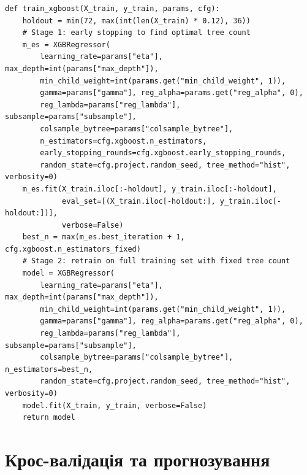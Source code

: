 \documentclass{bachelor_thesis}
\begin{document}
\begin{lstlisting}[caption={Підбір гіперпараметрів та фінальне навчання XGBoost}]
def train_xgboost(X_train, y_train, params, cfg):
    holdout = min(72, max(int(len(X_train) * 0.12), 36))
    # Stage 1: early stopping to find optimal tree count
    m_es = XGBRegressor(
        learning_rate=params["eta"], max_depth=int(params["max_depth"]),
        min_child_weight=int(params.get("min_child_weight", 1)),
        gamma=params["gamma"], reg_alpha=params.get("reg_alpha", 0),
        reg_lambda=params["reg_lambda"], subsample=params["subsample"],
        colsample_bytree=params["colsample_bytree"],
        n_estimators=cfg.xgboost.n_estimators,
        early_stopping_rounds=cfg.xgboost.early_stopping_rounds,
        random_state=cfg.project.random_seed, tree_method="hist", verbosity=0)
    m_es.fit(X_train.iloc[:-holdout], y_train.iloc[:-holdout],
             eval_set=[(X_train.iloc[-holdout:], y_train.iloc[-holdout:])],
             verbose=False)
    best_n = max(m_es.best_iteration + 1, cfg.xgboost.n_estimators_fixed)
    # Stage 2: retrain on full training set with fixed tree count
    model = XGBRegressor(
        learning_rate=params["eta"], max_depth=int(params["max_depth"]),
        min_child_weight=int(params.get("min_child_weight", 1)),
        gamma=params["gamma"], reg_alpha=params.get("reg_alpha", 0),
        reg_lambda=params["reg_lambda"], subsample=params["subsample"],
        colsample_bytree=params["colsample_bytree"], n_estimators=best_n,
        random_state=cfg.project.random_seed, tree_method="hist", verbosity=0)
    model.fit(X_train, y_train, verbose=False)
    return model
\end{lstlisting}

\section{Крос-валідація та прогнозування}
\label{sec:appendix_forecast}
\end{document}
